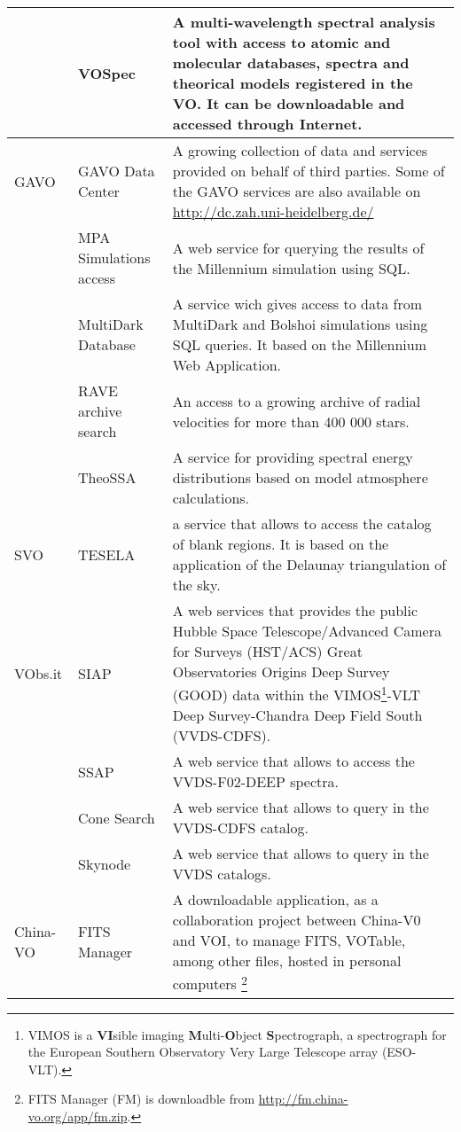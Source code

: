 \begin{table*}[h!t]
\begin{tabular}{|l|l|p{12.5cm}|}
			& VOSpec & A multi-wavelength spectral analysis tool with access to atomic and molecular databases, spectra and theorical models registered 
									in the VO. It can be downloadable and accessed through Internet.\\
	\hline								
	GAVO	& GAVO Data Center & A growing collection of data and services provided on behalf of third parties. Some of the GAVO services are also 
									available on \url{http://dc.zah.uni-heidelberg.de/}\\
			& MPA Simulations access & A web service for querying the results of the Millennium simulation using SQL.\\
			& MultiDark Database & A service wich gives access to data from MultiDark and Bolshoi simulations using SQL queries.  It based on the Millennium 
									Web Application. \\
			& RAVE archive search & An access to a growing archive of radial velocities for more than 400 000 stars.\\
			& TheoSSA & A service for providing spectral energy distributions based on model atmosphere calculations.\\
	\hline		
	SVO		& TESELA & a service that allows to access the catalog of blank regions. It is based on the application of the Delaunay triangulation
									 of the sky. \\
	\hline								 
	VObs.it	& SIAP & A web services that provides the public Hubble Space Telescope/Advanced Camera for Surveys (HST/ACS) Great Observatories Origins 
									Deep Survey (GOOD) data within the VIMOS\footnote{VIMOS is a \textbf{VI}sible imaging \textbf{M}ulti-\textbf{O}bject 
									\textbf{S}pectrograph, a spectrograph for the European Southern Observatory Very Large Telescope array (ESO-VLT).}-VLT
									Deep Survey-Chandra Deep Field South (VVDS-CDFS).\\
			& SSAP & A web service that allows to access the VVDS-F02-DEEP spectra. \\
			& Cone Search & A web service that allows to query in the VVDS-CDFS catalog.  \\
			& Skynode & A web service that allows to query in the VVDS catalogs. \\
	\hline		
	China-VO& FITS Manager & A downloadable application, as a collaboration project between China-V0 and VOI, to manage FITS, VOTable, among other files, 
								hosted in personal computers \footnote{FITS Manager (FM) is downloadble from \url{http://fm.china-vo.org/app/fm.zip}.}  \\

\end{tabular}
\end{table*}
